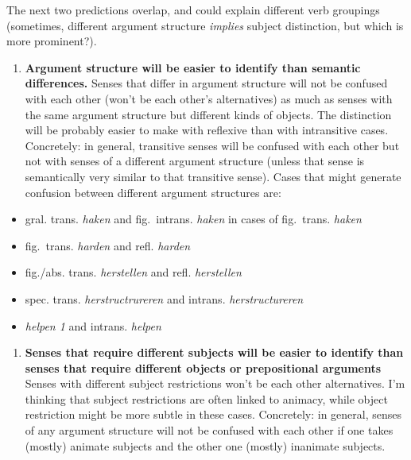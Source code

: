 \documentclass[
]{book}
\providecommand{\tightlist}{%
  \setlength{\itemsep}{0pt}\setlength{\parskip}{0pt}}
\begin{document}
The next two predictions overlap, and could explain different verb groupings (sometimes, different argument structure \emph{implies} subject distinction, but which is more prominent?).

\begin{enumerate}
\def\labelenumi{\arabic{enumi}.}
\setcounter{enumi}{4}
\tightlist
\item
  \textbf{Argument structure will be easier to identify than semantic differences.}
  Senses that differ in argument structure will not be confused with each other (won't be each other's alternatives) as much as senses with the same argument structure but different kinds of objects. The distinction will be probably easier to make with reflexive than with intransitive cases.
  Concretely: in general, transitive senses will be confused with each other but not with senses of a different argument structure (unless that sense is semantically very similar to that transitive sense). Cases that might generate confusion between different argument structures are:
\end{enumerate}

\begin{itemize}
\tightlist
\item
  gral. trans. \emph{haken} and fig.~intrans. \emph{haken} in cases of fig.~trans. \emph{haken}
\item
  fig.~trans. \emph{harden} and refl. \emph{harden}
\item
  fig./abs. trans. \emph{herstellen} and refl. \emph{herstellen}
\item
  spec. trans. \emph{herstructrureren} and intrans. \emph{herstructureren}
\item
  \emph{helpen 1} and intrans. \emph{helpen}
\end{itemize}

\begin{enumerate}
\def\labelenumi{\arabic{enumi}.}
\setcounter{enumi}{5}
\tightlist
\item
  \textbf{Senses that require different subjects will be easier to identify than senses that require different objects or prepositional arguments}
  Senses with different subject restrictions won't be each other alternatives. I'm thinking that subject restrictions are often linked to animacy, while object restriction might be more subtle in these cases.
  Concretely: in general, senses of any argument structure will not be confused with each other if one takes (mostly) animate subjects and the other one (mostly) inanimate subjects.
\end{enumerate}
\end{document}
